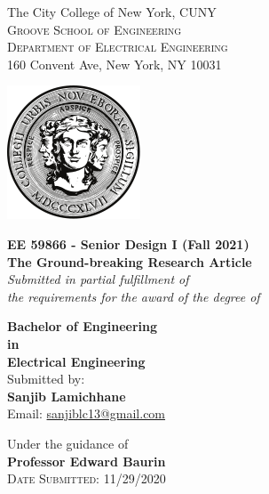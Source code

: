 \author{Sanjib Lamichhane}

\begin{titlepage}
	\begin{center}
		\Large{The City College of New York, CUNY}\\
		\normalsize
		\textsc{Groove School of Engineering}\\
		\textsc{Department of Electrical Engineering}\\
		160 Convent Ave, New York, NY 10031 \\
		\begin{center}
				\includegraphics[scale=0.5]{./images/logo_ccny}
		\end{center}
		\vspace{2cm}
		\textup{{\bf EE 59866 - Senior Design I (Fall 2021)}}\\[0.2in]
		
		\Large \textbf {The Ground-breaking Research Article}\\[0.5in]
		
		\small \emph{Submitted in partial fulfillment of\\
			the requirements for the award of the degree of}
		\vspace{.2in}
		
		{\bf Bachelor of Engineering \\in\\ Electrical Engineering}\\[0.5in]
		
		\normalsize Submitted by: \\
		\textbf{Sanjib Lamichhane}\\
		Email: \href{mailto:sanjiblc13@gmail.com}{sanjiblc13@gmail.com}
	
		\vspace{1cm}
		Under the guidance of\\
		{\textbf{Professor Edward Baurin}}\\[0.2in]
		\textsc{Date Submitted: 11/29/2020}
	\end{center}
	
\end{titlepage}

